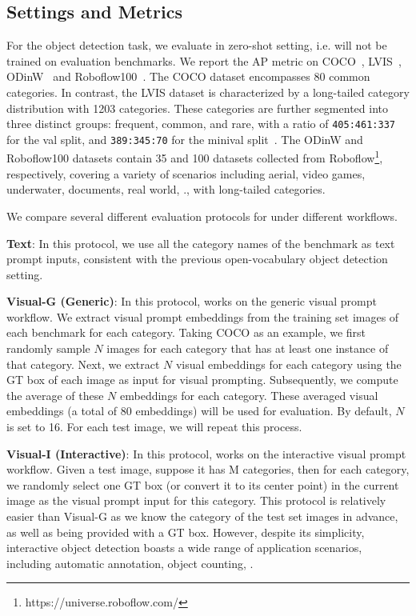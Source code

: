\subsection{Settings and Metrics}
For the object detection task, we evaluate in zero-shot setting, i.e. \ourmodel{} will not be trained on evaluation benchmarks. We report the AP metric on COCO~\cite{lin2014microsoft}, LVIS~\cite{gupta2019lvis}, ODinW~\cite{li2022elevater} and Roboflow100~\cite{ciaglia2022roboflow}. The COCO dataset encompasses 80 common categories. In contrast, the LVIS dataset is characterized by a long-tailed category distribution with 1203 categories. These categories are further segmented into three distinct groups: frequent, common, and rare, with a ratio of \texttt{405:461:337} for the val split, and \texttt{389:345:70} for the minival split~\cite{kamath2021mdetr}. The ODinW and Roboflow100 datasets contain 35 and 100 datasets collected from Roboflow\footnote{https://universe.roboflow.com/}, respectively, covering a variety of scenarios including aerial, video games, underwater, documents, real world, \etc., with long-tailed categories.

We compare several different evaluation protocols for \ourmodel{} under different workflows.

\textbf{Text}: In this protocol, we use all the category names of the benchmark as text prompt inputs, consistent with the previous open-vocabulary object detection setting.

\textbf{Visual-G (Generic)}: In this protocol, \ourmodel{} works on the generic visual prompt workflow. We extract visual prompt embeddings from the training set images of each benchmark for each category. Taking COCO as an example, we first randomly sample  $N$ images for each category that has at least one instance of that category. Next, we extract $N$ visual embeddings for each category using the GT box of each image as input for visual prompting. Subsequently, we compute the average of these $N$ embeddings for each category. These averaged visual embeddings (a total of 80 embeddings) will be used for evaluation. By default, $N$ is set to 16. For each test image, we will repeat this process.

\textbf{Visual-I (Interactive)}: In this protocol, \ourmodel{} works on the interactive visual prompt workflow. Given a test image, suppose it has M categories, then for each category, we randomly select one GT box (or convert it to its center point) in the current image as the visual prompt input for this category. This protocol is relatively easier than Visual-G as we know the category of the test set images in advance, as well as being provided with a GT box. However, despite its simplicity, interactive object detection boasts a wide range of application scenarios, including automatic annotation, object counting, \etc.


